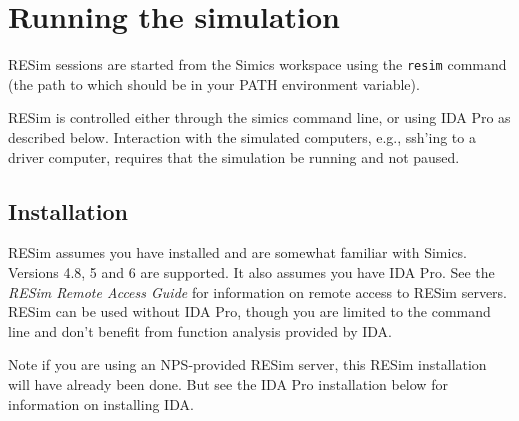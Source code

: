 \documentclass[titlepage]{article}
\begin{document}
\section{Running the simulation}
\label{running}
RESim sessions are started from the Simics workspace using the {\tt resim} command (the path to which should be in your PATH
environment variable).

RESim is controlled either through the simics command line, or using IDA Pro as described below.  Interaction with the simulated
computers, e.g., ssh'ing to a driver computer, requires that the simulation be running and not paused.

\subsection{Installation}
\label{installation}
RESim assumes you have installed and are somewhat familiar with Simics.  Versions 4.8, 5 and 6 are supported.
It also assumes you have IDA Pro. See the \textit{RESim Remote Access Guide} for information on remote access to RESim
servers.  RESim can be used without IDA Pro, though you are limited to the command line and don't benefit from
function analysis provided by IDA.

Note if you are using an NPS-provided RESim server, this RESim installation will have already been done.  But
see the IDA Pro installation below for information on installing IDA. 
\end{document}
